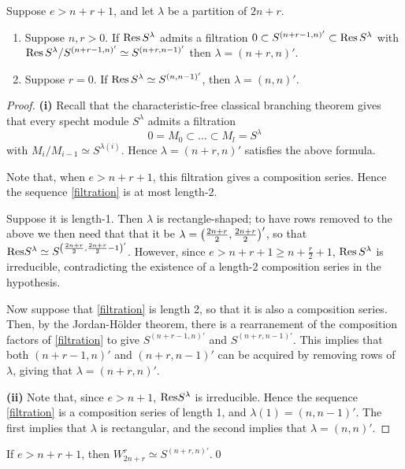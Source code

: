 \documentclass{amsart}
\begin{document}
\begin{proposition}
  Suppose $e > n + r + 1$, and let $\lambda$ be a partition of $2n + r$.
  \begin{enumerate}[label={(\roman*)}]
    \item Suppose $n,r > 0$.
      If $\text{Res} \, S^\lambda$ admits a filtration $0 \subset S^{(n+r-1,n)'} \subset \text{Res} \, S^\lambda$ with $\text{Res} \, S^\lambda / S^{(n + r - 1,n)'} \simeq S^{(n + r,n-1)'}$ then $\lambda = (n+r,n)'$.
    \item Suppose $r = 0$.
      If $\text{Res} \, S^\lambda \simeq S^{(n,n-1)'}$, then $\lambda = (n,n)'$.
  \end{enumerate}
\end{proposition}
\begin{proof}
  \textbf{(i)}
  Recall that the characteristic-free classical branching theorem gives that every specht module $S^{\lambda}$ admits a filtration 
  \begin{equation}
    0 = M_0 \subset \dots \subset M_l = S^{\lambda} \label{filtration}
  \end{equation}  
    with $M_i/M_{i-1} \simeq S^{\lambda(i)}$.
  Hence $\lambda = (n + r, n)'$ satisfies the above formula.

  Note that, when $e > n + r + 1$, this filtration gives a composition series.
  Hence the sequence \eqref{filtration} is at most length-2.

  Suppose it is length-1.
  Then $\lambda$ is rectangle-shaped;
  to have rows removed to the above we then need that that it be $\lambda = \left( \frac{2n + r}{2}, \frac{2n + r}{2} \right)'$, so that $\text{Res} S^{\lambda} \simeq S^{\left( \frac{2n + r}{2}, \frac{2n + r}{2} - 1 \right)'}$.
  However, since $e > n + r + 1 \geq n + \frac{r}{2} + 1$, $\text{Res} \, S^{\lambda}$ is irreducible, contradicting the existence of a length-2 composition series in the hypothesis.

  Now suppose that \eqref{filtration} is length 2, so that it is also a composition series.
  Then, by the Jordan-H\"older theorem, there is a rearranement of the composition factors of \ref{filtration} to give $S^{(n + r - 1,n)'}$ and $S^{(n + r, n - 1)'}$.
  This implies that both $(n + r - 1,n)'$ and $(n + r,n-1)'$ can be acquired by removing rows of $\lambda$, giving that $\lambda = (n+r,n)'$.
  
  \vspace{7pt}
  \textbf{(ii)}
  Note that, since $e > n + 1$, $\text{Res} S^\lambda$ is irreducible.
  Hence the sequence \eqref{filtration} is a composition series of length 1, and $\lambda(1) = (n,n-1)'$.
  The first implies that $\lambda$ is rectangular, and the second implies that $\lambda = (n,n)'$.
\end{proof}

\begin{corollary}
  If $e > n + r + 1$, then $W_{2n + r}^r \simeq S^{(n + r,n)'}$.\qed
\end{corollary}
\end{document}
